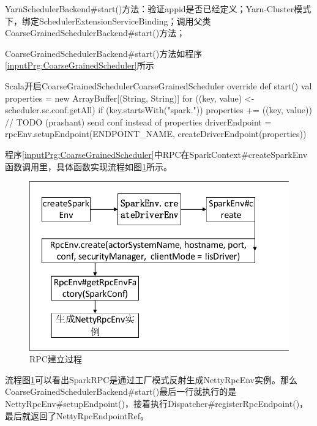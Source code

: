 \begin{enumerate}[\bfseries 1]
	
	YarnSchedulerBackend\#start()方法：验证appid是否已经定义；Yarn-Cluster模式下，绑定SchedulerExtensionServiceBinding；调用父类CoarseGrainedSchedulerBackend\#start()方法；
	
	CoarseGrainedSchedulerBackend\#start()方法如程序\ref{inputPrg:CoarseGrainedScheduler}所示
	\begin{codeInput}{Scala}{开启CoarseGrainedScheduler}{CoarseGrainedScheduler}
  override def start() {
    val properties = new ArrayBuffer[(String, String)]
    for ((key, value) <- scheduler.sc.conf.getAll) {
      if (key.startsWith("spark.")) {
        properties += ((key, value))
      }
    }		
    // TODO (prashant) send conf instead of properties
    driverEndpoint = rpcEnv.setupEndpoint(ENDPOINT_NAME, createDriverEndpoint(properties))
}
\end{codeInput}

程序\ref{inputPrg:CoarseGrainedScheduler}中RPC在SparkContext\#createSparkEnv函数调用里，具体函数实现流程如图\ref{fig:RPCinitialize}所示。
\begin{figure}[H] 
	\centering
	\includegraphics[scale=0.9]{figures/RPCinitialize.pdf}
	\caption{RPC建立过程}
	\label{fig:RPCinitialize}
\end{figure}

流程图\ref{fig:RPCinitialize}可以看出SparkRPC是通过工厂模式反射生成NettyRpcEnv实例。那么CoarseGrainedSchedulerBackend\#start()最后一行就执行的是NettyRpcEnv\#setupEndpoint()，接着执行Dispatcher\#registerRpcEndpoint()，最后就返回了NettyRpcEndpointRef。
\end{enumerate}
